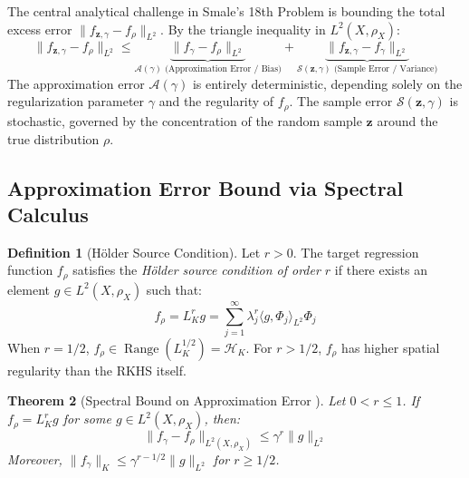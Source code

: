 \documentclass[11pt,a4paper]{article}
\newtheorem{theorem}{Theorem}[section]
\theoremstyle{definition}
\newtheorem{definition}[theorem]{Definition}
\begin{document}
The central analytical challenge in Smale's 18th Problem is bounding the total excess error $\|f_{\mathbf{z}, \gamma} - f_\rho\|_{L^2}$.
By the triangle inequality in $L^2(X, \rho_X)$:
\begin{equation}\label{eq:triangle_error_split}
\|f_{\mathbf{z}, \gamma} - f_\rho\|_{L^2} \le \underbrace{\|f_\gamma - f_\rho\|_{L^2}}_{\mathcal{A}(\gamma) \text{ (Approximation Error / Bias)}} + \underbrace{\|f_{\mathbf{z}, \gamma} - f_\gamma\|_{L^2}}_{\mathcal{S}(\mathbf{z}, \gamma) \text{ (Sample Error / Variance)}}
\end{equation}
The approximation error $\mathcal{A}(\gamma)$ is entirely deterministic, depending solely on the regularization parameter $\gamma$ and the regularity of $f_\rho$.
The sample error $\mathcal{S}(\mathbf{z}, \gamma)$ is stochastic, governed by the concentration of the random sample $\mathbf{z}$ around the true distribution $\rho$.

\subsection{Approximation Error Bound via Spectral Calculus}

\begin{definition}[Hölder Source Condition]\label{def:source_condition}
Let $r > 0$. The target regression function $f_\rho$ satisfies the \emph{Hölder source condition of order $r$} if there exists an element $g \in L^2(X, \rho_X)$ such that:
\begin{equation}\label{eq:source_cond}
f_\rho = L_K^r g = \sum_{j=1}^\infty \lambda_j^r \langle g, \Phi_j \rangle_{L^2} \Phi_j
\end{equation}
When $r = 1/2$, $f_\rho \in \operatorname{Range}(L_K^{1/2}) = \mathcal{H}_K$. For $r > 1/2$, $f_\rho$ has higher spatial regularity than the RKHS itself.
\end{definition}

\begin{theorem}[Spectral Bound on Approximation Error \cite{smale2007}]\label{thm:approx_error}
Let $0 < r \le 1$. If $f_\rho = L_K^r g$ for some $g \in L^2(X, \rho_X)$, then:
\begin{equation}\label{eq:approx_bound}
\|f_\gamma - f_\rho\|_{L^2(X, \rho_X)} \le \gamma^r \|g\|_{L^2}
\end{equation}
Moreover, $\|f_\gamma\|_K \le \gamma^{r - 1/2} \|g\|_{L^2}$ for $r \ge 1/2$.
\end{theorem}
\end{document}
